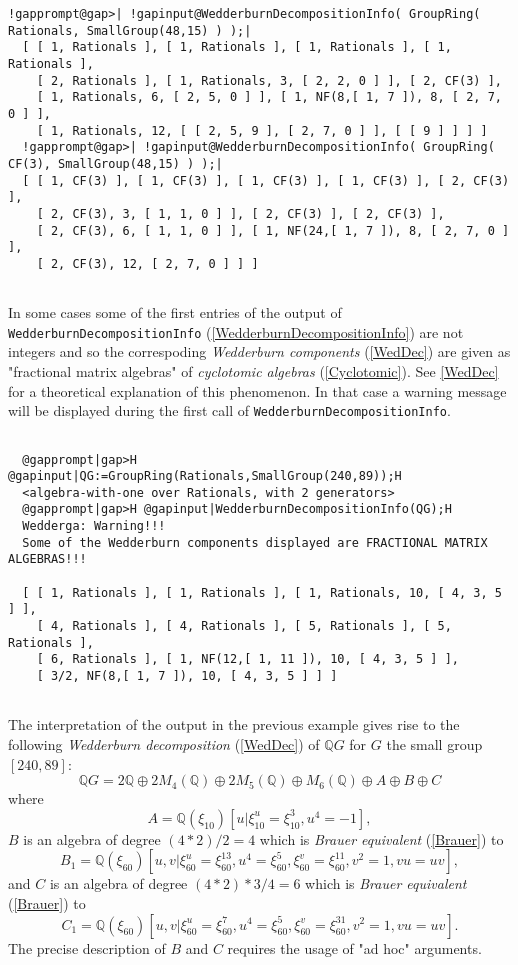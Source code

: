 \documentclass[a4paper,11pt]{report}
\begin{document}
{{\begin{Verbatim}[commandchars=!@|,fontsize=\small,frame=single,label=Example]
  !gapprompt@gap>| !gapinput@WedderburnDecompositionInfo( GroupRing( Rationals, SmallGroup(48,15) ) );|
  [ [ 1, Rationals ], [ 1, Rationals ], [ 1, Rationals ], [ 1, Rationals ], 
    [ 2, Rationals ], [ 1, Rationals, 3, [ 2, 2, 0 ] ], [ 2, CF(3) ], 
    [ 1, Rationals, 6, [ 2, 5, 0 ] ], [ 1, NF(8,[ 1, 7 ]), 8, [ 2, 7, 0 ] ], 
    [ 1, Rationals, 12, [ [ 2, 5, 9 ], [ 2, 7, 0 ] ], [ [ 9 ] ] ] ]
  !gapprompt@gap>| !gapinput@WedderburnDecompositionInfo( GroupRing( CF(3), SmallGroup(48,15) ) );|
  [ [ 1, CF(3) ], [ 1, CF(3) ], [ 1, CF(3) ], [ 1, CF(3) ], [ 2, CF(3) ],
    [ 2, CF(3), 3, [ 1, 1, 0 ] ], [ 2, CF(3) ], [ 2, CF(3) ],
    [ 2, CF(3), 6, [ 1, 1, 0 ] ], [ 1, NF(24,[ 1, 7 ]), 8, [ 2, 7, 0 ] ],
    [ 2, CF(3), 12, [ 2, 7, 0 ] ] ]
  
\end{Verbatim}
 In some cases some of the first entries of the output of \texttt{WedderburnDecompositionInfo} (\ref{WedderburnDecompositionInfo}) are not integers and so the correspoding \emph{Wedderburn components} (\ref{WedDec}) are given as "fractional matrix algebras" of \emph{cyclotomic algebras} (\ref{Cyclotomic}). See \ref{WedDec} for a theoretical explanation of this phenomenon. In that case a warning
message will be displayed during the first call of \texttt{WedderburnDecompositionInfo}. 
\begin{Verbatim}[commandchars=@|H,fontsize=\small,frame=single,label=Example]
  
  @gapprompt|gap>H @gapinput|QG:=GroupRing(Rationals,SmallGroup(240,89));H
  <algebra-with-one over Rationals, with 2 generators>
  @gapprompt|gap>H @gapinput|WedderburnDecompositionInfo(QG);H
  Wedderga: Warning!!! 
  Some of the Wedderburn components displayed are FRACTIONAL MATRIX ALGEBRAS!!!
  
  [ [ 1, Rationals ], [ 1, Rationals ], [ 1, Rationals, 10, [ 4, 3, 5 ] ],
    [ 4, Rationals ], [ 4, Rationals ], [ 5, Rationals ], [ 5, Rationals ],
    [ 6, Rationals ], [ 1, NF(12,[ 1, 11 ]), 10, [ 4, 3, 5 ] ],
    [ 3/2, NF(8,[ 1, 7 ]), 10, [ 4, 3, 5 ] ] ]
  
\end{Verbatim}
 The interpretation of the output in the previous example gives rise to the
following \emph{Wedderburn decomposition} (\ref{WedDec}) of ${\ensuremath{\mathbb Q}} G$ for $G$ the small group $[240,89]$: 
\[ {\ensuremath{\mathbb Q}} G = 2 {\ensuremath{\mathbb Q}} \oplus 2 M_4(
{\ensuremath{\mathbb Q}} ) \oplus 2 M_5( {\ensuremath{\mathbb Q}} ) \oplus
M_6( {\ensuremath{\mathbb Q}} ) \oplus A \oplus B \oplus C \]
 where 
\[ A = {\ensuremath{\mathbb Q}} (\xi_{10})[u|\xi_{10}^u = \xi_{10}^3, u^4 = -1], \]
 $B$ is an algebra of degree $(4*2 )/2 = 4 $ which is \emph{Brauer equivalent} (\ref{Brauer}) to 
\[ B_1 = {\ensuremath{\mathbb Q}} (\xi_{60})[u,v|\xi_{60}^u = \xi_{60}^{13}, u^4
= \xi_{60}^5, \xi_{60}^v = \xi_{60}^{11}, v^2 = 1, vu=uv], \]
 and $C$ is an algebra of degree $(4*2)*3/4 = 6 $ which is \emph{Brauer equivalent} (\ref{Brauer}) to 
\[ C_1 = {\ensuremath{\mathbb Q}} (\xi_{60})[u,v|\xi_{60}^u = \xi_{60}^7, u^4 =
\xi_{60}^5, \xi_{60}^v = \xi_{60}^{31}, v^2 = 1, vu=uv]. \]
 The precise description of $B$ and $C$ requires the usage of "ad hoc" arguments. }

}
\end{document}
